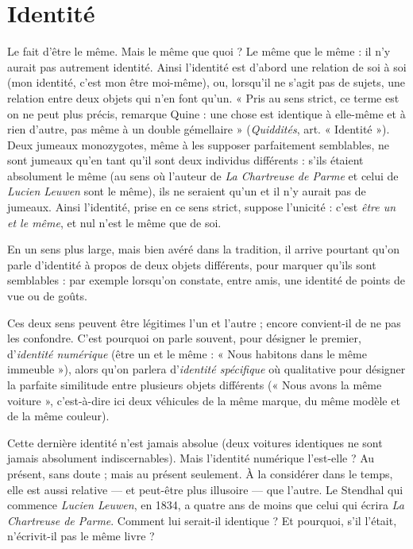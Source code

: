 \section{Identité}
Le fait d’être le même. Mais le même que quoi ? Le même que
le même : il n’y aurait pas autrement identité. Ainsi l’identité
est d’abord une relation de soi à soi (mon identité, c’est mon être moi-même),
ou, lorsqu'il ne s’agit pas de sujets, une relation entre deux objets qui n’en font
qu'un. « Pris au sens strict, ce terme est on ne peut plus précis, remarque
Quine : une chose est identique à elle-même et à rien d’autre, pas même à un
double gémellaire » ({\it Quiddités}, art. « Identité »). Deux jumeaux monozygotes,
même à les supposer parfaitement semblables, ne sont jumeaux qu’en tant qu’il
sont deux individus différents : s’ils étaient absolument le même (au sens où
l’auteur de {\it La Chartreuse de Parme} et celui de {\it Lucien Leuwen} sont le même), ils
ne seraient qu’un et il n’y aurait pas de jumeaux. Ainsi l'identité, prise en ce
sens strict, suppose l’unicité : c’est {\it être un et le même}, et nul n’est le même que
de soi.

En un sens plus large, mais bien avéré dans la tradition, il arrive pourtant
qu’on parle d'identité à propos de deux objets différents, pour marquer qu’ils
sont semblables : par exemple lorsqu'on constate, entre amis, une identité de
points de vue ou de goûts.

Ces deux sens peuvent être légitimes l’un et l’autre ; encore convient-il
de ne pas les confon\-dre. C’est pourquoi on parle souvent, pour désigner le
premier, d'{\it identité numérique} (être un et le même : « Nous habitons dans le
même immeuble »), alors qu’on parlera d'{\it identité spécifique} où qualitative pour
désigner la parfaite similitude entre plusieurs objets différents (« Nous avons la
même voiture », c’est-à-dire ici deux véhicules de la même marque, du même
modèle et de la même couleur).

Cette dernière identité n’est jamais absolue (deux voitures identiques ne
sont jamais absolument indiscernables). Mais l'identité numérique l’est-elle ?
Au présent, sans doute ; mais au présent seulement. À la considérer dans le
temps, elle est aussi relative — et peut-être plus illusoire — que l’autre. Le
Stendhal qui commence {\it Lucien Leuwen}, en 1834, a quatre ans de moins que
celui qui écrira {\it La Chartreuse de Parme}. Comment lui serait-il identique ? Et
pourquoi, s’il l'était, n’écrivit-il pas le même livre ?


